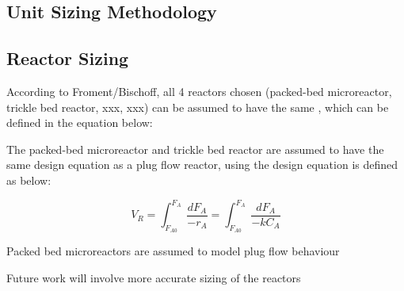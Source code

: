 \begin{landscape}
\section{Unit Sizing Methodology}
\label{app:sizing}
\subsection{Reactor Sizing}
According to Froment/Bischoff, all 4 reactors chosen (packed-bed microreactor, trickle bed reactor, xxx, xxx) can be assumed to have the same , which can be defined in the equation below:

The packed-bed microreactor and trickle bed reactor are assumed to have the same design equation as a plug flow reactor, using the design equation is defined as below:

\begin{equation}
    V_R = \int_{F_{A0}}^{F_{A}} \frac{dF_A}{-r_A} = \int_{F_{A0}}^{F_{A}} \frac{dF_A}{-kC_A}
    \label{reactor_sizing}
\end{equation}

Packed bed microreactors are assumed to model plug flow behaviour

Future work will involve more accurate sizing of the reactors

\end{landscape}
